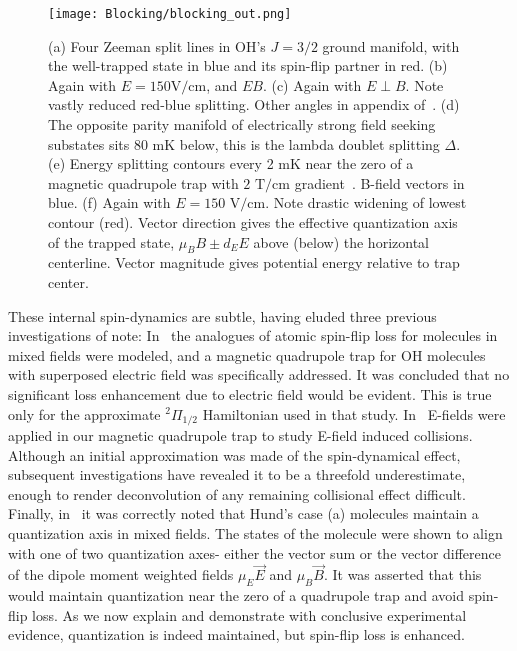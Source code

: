\documentclass[%
 reprint,
groupedaddress,
 amsmath,amssymb,
 aps,
prl,
]{revtex4-1}
\newcommand{\epb}{{$E\!\perp\!B$}}
\begin{document}

\begin{figure}[tb]
\texttt{[image: Blocking/blocking\_out.png]}%
\caption{
(a) Four Zeeman split lines in OH's $J=3/2$ ground manifold, with the well-trapped state in blue and its spin-flip partner in red. (b) Again with $E=150\text{V/cm}$, and $E$\raisebox{0.5px}{$\parallel$}$B$. (c) Again with \epb. Note vastly reduced red-blue splitting. Other angles in appendix of~\cite{Stuhl2013}. (d) The opposite parity manifold of electrically strong field seeking substates sits $80\text{ mK}$ below, this is the lambda doublet splitting $\Delta$. (e) Energy splitting contours every 2 mK near the zero of a magnetic quadrupole trap with $2\text{ T/cm}$ gradient~\cite{Stuhl2012uwave}. B-field vectors in blue. (f) Again with $E=150\text{ V/cm}$. Note drastic widening of lowest contour (red). Vector direction gives the effective quantization axis of the trapped state, $\mu_BB\pm d_EE$ above (below) the horizontal centerline. Vector magnitude gives potential energy relative to trap center.
\label{fig:blocking}}
\end{figure}

These internal spin-dynamics are subtle, having eluded three previous investigations of note: In~\cite{Lara2008} the analogues of atomic spin-flip loss for molecules in mixed fields were modeled, and a magnetic quadrupole trap for OH molecules with superposed electric field was specifically addressed. It was concluded that no significant loss enhancement due to electric field would be evident. This is true only for the approximate $^2\Pi_{1/2}$ Hamiltonian used in that study. In~\cite{Stuhl2013} E-fields were applied in our magnetic quadrupole trap to study E-field induced collisions. Although an initial approximation was made of the spin-dynamical effect, subsequent investigations have revealed it to be a threefold underestimate, enough to render deconvolution of any remaining collisional effect difficult. Finally, in~\cite{Bohn2013} it was correctly noted that Hund's case (a) molecules maintain a quantization axis in mixed fields. The states of the molecule were shown to align with one of two quantization axes- either the vector sum or the vector difference of the dipole moment weighted fields $\mu_E\vec{E}$ and $\mu_B\vec{B}$. It was asserted that this would maintain quantization near the zero of a quadrupole trap and avoid spin-flip loss. As we now explain and demonstrate with conclusive experimental evidence, quantization is indeed maintained, but spin-flip loss is enhanced.
\end{document}
